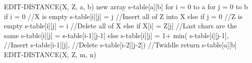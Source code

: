 EDIT-DISTANCE(X, Z, a, b)
	new array s-table[a][b]
	for i = 0 to a
		for j = 0 to b
			if i = 0					//X is empty
				s-table[i][j] = j 		//Insert all of Z into X
			else if j = 0				//Z is empty
				s-table[i][j] = i 		//Delete all of X
			else if X[i] = Z[j]			//Last chars are the same
				s-table[i][j] = s-table[i-1][j-1]
			else
				s-table[i][j] = 1+ min(
					s-table[i][j-1],	//Insert
					s-table[i-1][j],	//Delete
					s-table[i-2][j-2])	//Twiddle
	return s-table[a][b]
EDIT-DISTANCE(X, Z, m, n)
